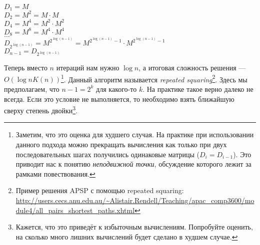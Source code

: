 \begin{center}
    $D_1 = M$ \\
    $D_2 = M^2 = M \cdot M$ \\
    $D_4 = M^4 = M^2 \cdot M^2$ \\
    $D_8 = M^8 = M^4 \cdot M^4$ \\
    $\dots$ \\
    $D_{2^{\log(n-1)}} = M^{2^{\log(n-1)}} = M^{2^{\log(n-1)} - 1} \cdot M^{2^{\log(n-1)} - 1}$ \\
    $D_{n-1} = D_{2^{\log(n-1)}}$ \\
\end{center}

Теперь вместо $n$ итераций нам нужно $\log{n}$, а итоговая сложность решения --- $O(\log{n} K(n))$\footnote{Заметим, что это оценка для худшего случая. На практике при использовании данного подхода можно прекращать вычисления как только при двух последовательных шагах получились одинаковые матрицы ($D_i = D_{i-1}$). Это приводит нас к понятию \textit{неподвижной точки}, обсуждение которого лежит за рамками повествования.}.
Данный алгоритм называется \textit{repeated squaring}\footnote{Пример решения APSP с помощью repeated squaring: \url{http://users.cecs.anu.edu.au/~Alistair.Rendell/Teaching/apac_comp3600/module4/all_pairs_shortest_paths.xhtml}}. Здесь мы предполагаем, что $n-1 = 2^k$ для какого-то $k$. На практике такое верно далеко не всегда. Если это условие не выполняется, то необходимо взять ближайшую сверху степень двойки\footnote{Кажется, что это приведёт к избыточным вычислениям. Попробуйте оценить, на сколько много лишних вычислений будет сделано в худшем случае.}.

